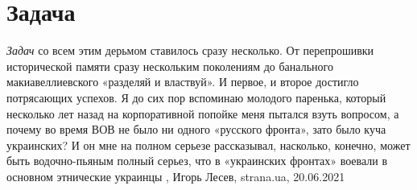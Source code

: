  
 
 
 
 
\chapter{Задача}

\emph{Задач} со всем этим дерьмом ставилось сразу несколько. От перепрошивки
исторической памяти сразу нескольким поколениям до банального макиавеллиевского
«разделяй и властвуй». И первое, и второе достигло потрясающих успехов. Я до
сих пор вспоминаю молодого паренька, который несколько лет назад на
корпоративной попойке меня пытался взуть вопросом, а почему во время ВОВ не
было ни одного «русского фронта», зато было куча украинских? И он мне на полном
серьезе рассказывал, насколько, конечно, может быть водочно-пьяным полный
серьез, что в «украинских фронтах» воевали в основном этнические украинцы
, 
Игорь Лесев, strana.ua, 20.06.2021
